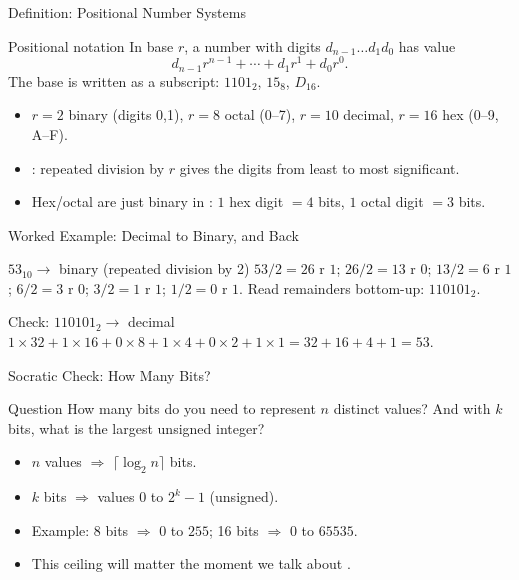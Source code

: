 \documentclass[aspectratio=169]{beamer}
\begin{document}
\begin{frame}{Definition: Positional Number Systems}
  \begin{block}{Positional notation}
    In base $r$, a number with digits $d_{n-1}\dots d_1 d_0$ has value
    \[
      d_{n-1} r^{n-1} + \cdots + d_1 r^1 + d_0 r^0.
    \]
    The base is written as a subscript: $1101_2$, $15_8$, $D_{16}$.
  \end{block}
  \begin{itemize}
    \item $r=2$ binary (digits 0,1), $r=8$ octal (0--7), $r=10$ decimal,
      $r=16$ hex (0--9, A--F).
    \item {}: repeated division by $r$ gives the digits from least
      to most significant.
    \item Hex/octal are just binary in : $1$ hex digit $=4$ bits,
      $1$ octal digit $=3$ bits.
  \end{itemize}
\end{frame}

\begin{frame}{Worked Example: Decimal to Binary, and Back}
  \begin{block}{$53_{10} \to$ binary (repeated division by 2)}
    $53/2 = 26$ r $1$; $26/2 = 13$ r $0$; $13/2 = 6$ r $1$; $6/2 = 3$ r $0$;
    $3/2 = 1$ r $1$; $1/2 = 0$ r $1$. Read remainders bottom-up: $110101_2$.
  \end{block}
  \begin{exampleblock}{Check: $110101_2 \to$ decimal}
    $1{\times}32 + 1{\times}16 + 0{\times}8 + 1{\times}4 + 0{\times}2 + 1{\times}1
    = 32+16+4+1 = 53$. 
  \end{exampleblock}
  \vspace{0.2cm}
\end{frame}

\begin{frame}{Socratic Check: How Many Bits?}
  \begin{alertblock}{Question}
    How many bits do you need to represent $n$ distinct values? And with $k$
    bits, what is the largest unsigned integer?
  \end{alertblock}
  \begin{itemize}
    \item $n$ values $\Rightarrow$ $\lceil \log_2 n \rceil$ bits.
    \item $k$ bits $\Rightarrow$ values $0$ to $2^k - 1$ (unsigned).
    \item Example: 8 bits $\Rightarrow$ $0$ to $255$; 16 bits $\Rightarrow$
      $0$ to $65535$.
    \item This ceiling will matter the moment we talk about .
  \end{itemize}
\end{frame}
\end{document}
